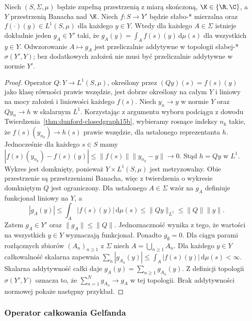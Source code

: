 \begin{twierdzenie}
\label{thm:gelfand-exists15b}
Niech $(S,\Sigma,\mu)$ będzie zupełną przestrzenią
z miarą skończoną, $\K\in\{\R,\C\}$, a $Y$
przestrzenią Banacha nad $\K$. Niech $f:S\to Y'$
będzie słabo-* mierzalna oraz
$f(\cdot)(y)\in L^1(S,\mu)$ dla każdego $y\in Y$.
Wtedy dla każdego $A\in\Sigma$ istnieje dokładnie jeden
$g_A\in Y'$ taki, że
$g_A(y)=\int_A f(s)(y)\,\mathrm d\mu(s)$
dla wszystkich $y\in Y$. Odwzorowanie
$A\mapsto g_A$ jest przeliczalnie addytywne
w topologii słabej-* $\sigma(Y',Y)$; bez dodatkowych
założeń nie musi być przeliczalnie addytywne w normie $Y'$.
\end{twierdzenie}
\begin{proof}
Operator $Q:Y\to L^1(S,\mu)$, określony przez
$(Qy)(s)=f(s)(y)$ jako klasę równości prawie wszędzie,
jest dobrze określony na całym $Y$ i liniowy na mocy
założeń i liniowości każdego $f(s)$. Niech $y_n\to y$
w normie $Y$ oraz $Qy_n\to h$ w skalarnym $L^1$.
Korzystając z argumentu wyboru podciągu z dowodu
Twierdzenia~\ref{thm:dunford-closedgraph15b}, wybieramy
rosnące indeksy $n_k$ takie, że $f(s)(y_{n_k})\to h(s)$
prawie wszędzie, dla ustalonego reprezentanta $h$.
Jednocześnie dla każdego $s\in S$ mamy
$|f(s)(y_{n_k})-f(s)(y)|\le\|f(s)\|\|y_{n_k}-y\|\to0$.
Stąd $h=Qy$ w $L^1$. Wykres jest domknięty, ponieważ
$Y\times L^1(S,\mu)$ jest metryzowalny. Obie przestrzenie
są przestrzeniami Banacha, więc z twierdzenia o wykresie
domkniętym $Q$ jest ograniczony.
Dla ustalonego $A\in\Sigma$ wzór na $g_A$ definiuje
funkcjonał liniowy na $Y$, a
\[
 |g_A(y)|\le\int_A|f(s)(y)|\,\mathrm d\mu(s)
 \le\|Qy\|_{L^1}\le\|Q\|\|y\|.
\]
Zatem $g_A\in Y'$ oraz $\|g_A\|\le\|Q\|$.
Jednoznaczność wynika z tego, że wartości na wszystkich
$y\in Y$ wyznaczają funkcjonał. Ponadto $g_\emptyset=0$.
Dla ciągu parami rozłącznych zbiorów $(A_n)_{n\ge1}$ z $\Sigma$
niech $A=\bigcup_{n\ge1}A_n$. Dla każdego $y\in Y$
całkowalność skalarna zapewnia
$\sum_n|g_{A_n}(y)|\le\int_A|f(s)(y)|\,\mathrm d\mu(s)<\infty$.
Skalarna addytywność całki daje
$g_A(y)=\sum_{n\ge1}g_{A_n}(y)$.
Z definicji topologii $\sigma(Y',Y)$ oznacza to, że
$\sum_{n=1}^N g_{A_n}\to g_A$ w tej topologii.
Brak addytywności normowej pokaże następny przykład.
\end{proof}

\subsubsection{Operator całkowania Gelfanda}

